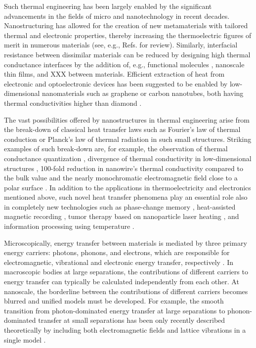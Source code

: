 Such thermal engineering has been largely enabled by the significant advancements in the fields of micro and nanotechnology in recent decades. Nanostructuring has allowed for the creation of new metamaterials with tailored thermal and electronic properties, thereby increasing the thermoelectric figures of merit in numerous materials (see, e.g., Refs. \cite{vineis10,kanatzidis10,shakouri11} for review). Similarly, interfacial resistance between dissimilar materials can be reduced by designing high thermal conductance interfaces by the addition of, e.g., functional molecules \cite{hopkins11,kaur14}, nanoscale thin films, and XXX between materials. Efficient extraction of heat from electronic and optoelectronic devices has been suggested \cite{ghosh08,yan12} to be enabled by low-dimensional nanomaterials such as graphene or carbon nanotubes, both having thermal conductivities higher than diamond \cite{balandin11}. 

The vast possibilities offered by nanostructures in thermal engineering arise from the break-down of classical heat transfer laws such as Fourier's law of thermal conduction \cite{fourier} or Planck's law of thermal radiation \cite{planck00a} in such small structures. Striking examples of such break-down are, for example, the observation of thermal conductance quantization \cite{rego98,schwab00}, divergence of thermal conductivity in low-dimensional structures \cite{lepri97,lepri03,dhar08,xu14}, 100-fold reduction in nanowire's thermal conductivity compared to the bulk value \cite{hochbaum08} and the nearly monochromatic electromagnetic field close to a polar surface \cite{carminati99,shchegrov00}. In addition to the applications in thermoelectricity and electronics mentioned above, such novel heat transfer phenomena play an essential role also in completely new technologies such as phase-change memory \cite{lankhorst05}, heat-assisted magnetic recording \cite{pan09}, tumor therapy based on nanoparticle laser heating \cite{avedisian09}, and information processing using temperature \cite{li12_rmp}.  %

Microscopically, energy transfer between materials is mediated by three primary energy carriers: photons, phonons, and electrons, which are responsible for electromagnetic, vibrational and electronic energy transfer, respectively \cite{chen}. In macroscopic bodies at large separations, the contributions of different carriers to energy transfer can typically be calculated independently from each other. At nanoscale, the borderline between the contributions of different carriers becomes blurred and unified models must be developed. For example, the smooth transition from photon-dominated energy transfer at large separations to phonon-dominated transfer at small separations has been only recently described theoretically by including both electromagnetic fields and lattice vibrations in a single model \cite{xiong14,chiloyan15}. 


